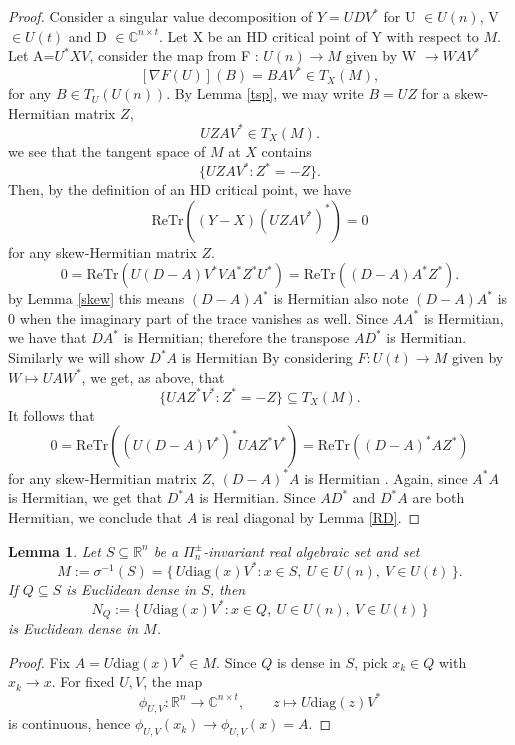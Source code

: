 \documentclass[11pt]{amsart}
\theoremstyle{plain}
\newtheorem{lemma}[theorem]{Lemma}
\theoremstyle{definition}
\theoremstyle{remark}
\begin{document}
\begin{proof}
    Consider a singular value decomposition of $Y=UDV^*$ for U $\in U(n)$, V$\in U(t)$ and D $\in \mathbb{C}^{n\times t}$. Let X be an HD critical point of Y with respect to $M$. Let A=$U^*XV$, consider the map from F : $U(n) \to M$ given by W $\to WAV^*$
    \[
[\nabla F(U)](B) = B A V^* \in T_{X}(M),
\]
for any \( B \in T_{U}(U(n)) \). By Lemma \ref{tsp}, we may write \( B = UZ \) for a skew-Hermitian matrix \( Z \), 
\[
UZ A V^* \in T_{X}(M).
\]
 we see that the tangent space of \( M \) at \( X \) contains
\[
\{ UZ A V^* : Z^*= -Z \}.
\]
Then, by the definition of an HD critical point, we have
\[
\mathrm{Re}\mathrm{Tr}\left((Y - X)(UZ A V^*)^*\right) = 0
\]
for any skew-Hermitian matrix \( Z \).
\[
0 = \mathrm{Re}\mathrm{Tr}\left(U(D - A)V^*V A^* Z^* U^*\right) = \mathrm{Re}\mathrm{Tr}\left((D - A)A^* Z^*\right).
\]
 by Lemma \ref{skew} this means $(D-A)A^*$ is Hermitian also note $(D-A)A^*$ is 0 when the imaginary part of the trace vanishes as well. Since $AA^*$ is Hermitian, we
have that $DA^*$ is Hermitian; therefore the transpose $AD^*$ is Hermitian. Similarly we will show $D^*A$ is Hermitian
By considering \( F : U(t) \to M \) given by \( W \mapsto U A W^* \), we get, as above, that  
\[
\{ U A Z^* V^* : Z^* = -Z \} \subseteq T_{X}(M).
\]  
It follows that  
\[
0 = \mathrm{Re}\mathrm{Tr}\left( (U(D - A)V^*)^* U A Z^* V^* \right) = \mathrm{Re}\mathrm{Tr}\left( (D - A)^* A Z^* \right)
\]  
for any skew-Hermitian matrix \( Z \), \( (D - A)^* A \) is Hermitian
.  
Again, since \( A^* A \) is Hermitian, we get that \( D^* A \) is Hermitian.  
Since \( A D^* \) and \( D^* A \) are both Hermitian, we conclude that \( A \) is real diagonal by Lemma \ref{RD}.
\end{proof}
\begin{lemma}\label{des}
Let $S \subseteq \mathbb{R}^n$ be a $\Pi_n^{\pm}$-invariant real algebraic set and set
\[
M:=\sigma^{-1}(S)
=\{\,U\mathrm{diag}(x)V^* : x\in S,\ U\in U(n),\ V\in U(t)\,\}.
\]
If $Q\subseteq S$ is Euclidean dense in $S$, then
\[
N_Q:=\{\,U\mathrm{diag}(x)V^* : x\in Q,\ U\in U(n),\ V\in U(t)\,\}
\]
is Euclidean dense in $M$.
\end{lemma}

\begin{proof}
Fix $A=U\mathrm{diag}(x)V^*\in M$. Since $Q$ is dense in $S$, pick $x_k\in Q$ with $x_k\to x$.
For fixed $U,V$, the map
\[
\phi_{U,V}: \mathbb{R}^n \to \mathbb{C}^{n\times t}, \qquad z \mapsto U\mathrm{diag}(z)V^*
\]
is continuous, hence $\phi_{U,V}(x_k)\to \phi_{U,V}(x)=A$.
\end{proof}
\end{document}
